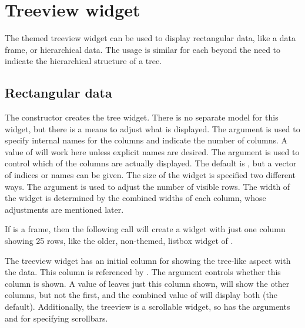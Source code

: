 \section{Treeview widget}
\label{sec:tcltk:treeview-widget}

The themed treeview widget can be used to display rectangular data,
like a data frame, or hierarchical data. The usage is similar for each
beyond the need to indicate the hierarchical structure of a tree.

\subsection{Rectangular data}


The  constructor creates the tree
widget. There is no separate model for this widget, but there is a
means to adjust what is displayed.  The argument
 is used to specify internal names for
the columns and indicate the number of columns. A value of 
will work here unless explicit names are desired. The argument
 is used to control which of the
columns are actually displayed. The default is , but a
vector of indices or names can be given.  The size of the widget is
specified two different ways.  The 
argument is used to adjust the number of visible rows. The width of
the widget is determined by the combined widths of each column, whose
adjustments are mentioned later.



If  is a frame, then the following call will create a widget
with just one column showing 25 rows, like the older, non-themed,
listbox widget of \Tk.

\begin{Schunk}
\end{Schunk}



The treeview widget has an initial column for showing the tree-like
aspect with the data. This column is referenced by . The
 argument controls whether this column is
shown. A value of  leaves just this column shown,
 will show the other columns, but not the first, and
the combined value of  will display both (the
default).  Additionally, the treeview is a scrollable widget, so has
the arguments  and
 for specifying scrollbars.

